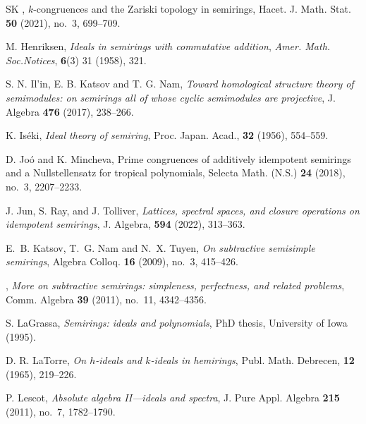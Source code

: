 \documentclass[11pt,english]{amsart}
\theoremstyle{definition}
\numberwithin{equation}{section}
\begin{document}
\begin{thebibliography}{SK}
 \bysame, $k$-congruences and the Zariski topology in semirings, Hacet. J. Math. Stat. {\bf 50} (2021), no.~3, 699--709.
	
 M. Henriksen, \textit{Ideals in semirings with commutative addition}, \textit{Amer. Math. Soc.Notices}, \textbf{6}(3) 31 (1958), 321.
	
	
 S. N. Il'in, E. B. Katsov and T. G. Nam, \textit{Toward homological structure theory of semimodules: on semirings all of whose cyclic semimodules are projective}, J. Algebra {\bf 476} (2017), 238--266.
	
	
 K. Is\'{e}ki, \textit{Ideal theory of semiring}, Proc. Japan. Acad., \textbf{32} (1956), 554--559.

 D. Jo\'o{} and K. Mincheva, Prime congruences of additively idempotent semirings and a Nullstellensatz for tropical polynomials, Selecta Math. (N.S.) {\bf 24} (2018), no.~3, 2207--2233.

    
 J. Jun, S. Ray, and J. Tolliver, \textit{Lattices, spectral spaces, and closure operations on idempotent semirings}, J. Algebra, \textbf{594} (2022), 313--363.

 E.~B. Katsov, T.~G. Nam and N.~X. Tuyen, \textit{On subtractive semisimple semirings}, Algebra Colloq. {\bf 16} (2009), no.~3, 415--426.

 \bysame, \textit{More on subtractive semirings: simpleness, perfectness, and related problems}, Comm. Algebra {\bf 39} (2011), no.~11, 4342--4356.
	
 
 S. LaGrassa, \textit{Semirings: ideals and polynomials}, PhD thesis, University of Iowa (1995).

	
 D. R. LaTorre, \textit{On $h$-ideals and $k$-ideals in hemirings}, Publ. Math. Debrecen, \textbf{12} (1965), 219--226.

 P. Lescot, \textit{Absolute algebra II---ideals and spectra}, J. Pure Appl. Algebra {\bf 215} (2011), no.~7, 1782--1790.
	

\end{thebibliography}
\end{document}
